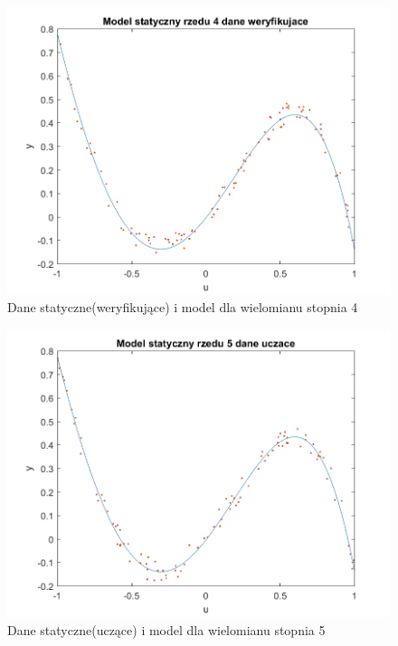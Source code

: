 \documentclass{article}
\begin{document}
\begin{figure}
\centering
\includegraphics[width=0.95\linewidth]{dane_statyczne_model_rzedu_4_weryf}
\caption{Dane statyczne(weryfikujące) i model dla wielomianu stopnia 4}
\label{fig:danestatyczneweryf4}
\end{figure}

\begin{figure}
\centering
\includegraphics[width=0.95\linewidth]{dane_statyczne_model_rzedu_5_uczace}
\caption{Dane statyczne(uczące) i model dla wielomianu stopnia 5}
\label{fig:danestatyczneuczace5}
\end{figure}
\end{document}
